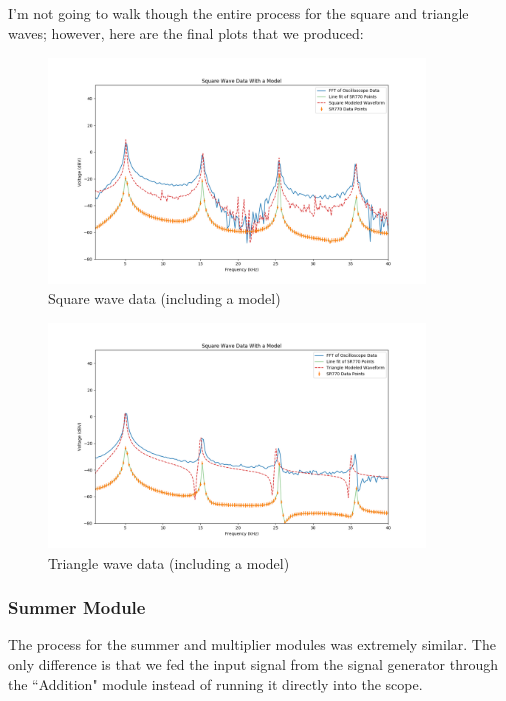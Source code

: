 \documentclass{article}
\begin{document}
I'm not going to walk though the entire process for the square and triangle
waves; however, here are the final plots that we produced:

\begin{figure}[H]
    \centering
\begin{minipage}{11cm}
\begin{tcolorbox}
        \includegraphics[width=10cm, height=6cm]{figures/figure8.png}
        \caption{Square wave data (including a model)}
        \label{fig:fig8}
\end{tcolorbox}
\end{minipage}
\end{figure}

\begin{figure}[H]
    \centering
\begin{minipage}{11cm}
\begin{tcolorbox}
    \centering
        \includegraphics[width=10cm, height=6cm]{figures/figure9.png}
        \caption{Triangle wave data (including a model)}
        \label{fig:fig9}
\end{tcolorbox}
\end{minipage}
\end{figure}

\subsubsection{Summer Module}%
The process for the summer and multiplier modules was extremely similar. The
only difference is that we fed the input signal from the signal generator
through the ``Addition" module instead of running it directly into the scope.
\end{document}
